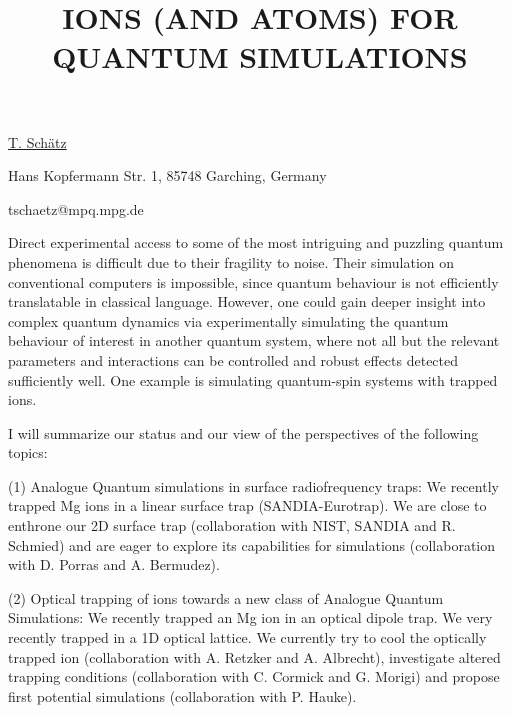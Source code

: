 \title{IONS (AND ATOMS) FOR QUANTUM SIMULATIONS}

\underline{T. Sch\"{a}tz} 

{\normalsize{\vspace{-4mm}
Hans Kopfermann Str. 1, 85748 Garching, Germany

\email tschaetz@mpq.mpg.de}}

Direct experimental access to some of the most intriguing and puzzling quantum phenomena is difficult due to their fragility to noise. Their simulation on conventional computers is impossible, since quantum behaviour is not efficiently translatable in classical language. However, one could gain deeper insight into complex quantum dynamics via experimentally simulating the quantum behaviour of interest in another quantum system, where not all but the relevant parameters and interactions can be controlled and robust effects detected sufficiently well. One example is simulating quantum-spin systems with trapped ions.

I will summarize our status and our view of the perspectives of the following topics:

(1) Analogue Quantum simulations in surface radiofrequency traps:
We recently trapped Mg ions in a linear surface trap (SANDIA-Eurotrap). We are close to enthrone our 2D surface trap (collaboration with NIST, SANDIA and R. Schmied) and are eager to explore its capabilities for simulations (collaboration with D. Porras and A. Bermudez).

(2) Optical trapping of ions towards a new class of Analogue Quantum Simulations:
We recently trapped an Mg ion in an optical dipole trap. We very recently trapped in a 1D optical lattice. We currently try to cool the optically trapped ion (collaboration with A. Retzker and A. Albrecht), investigate altered trapping conditions (collaboration with C. Cormick and G. Morigi) and propose first potential simulations (collaboration with P. Hauke).

\vspace{\baselineskip} 